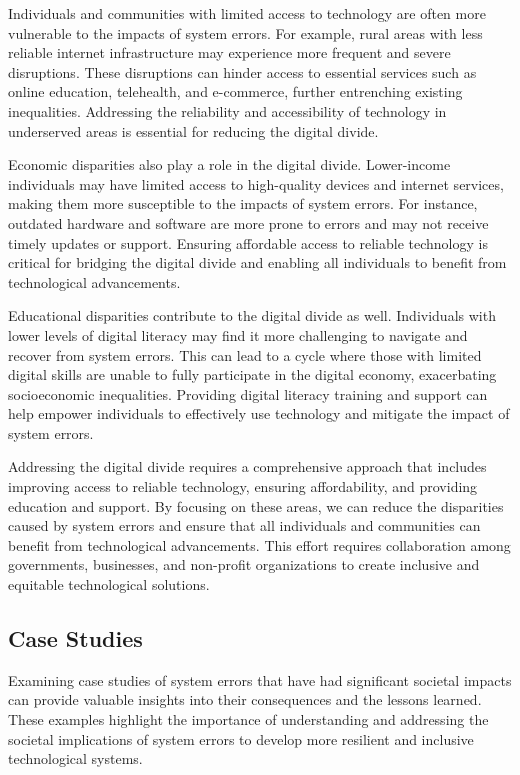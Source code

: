 \documentclass[10pt, conference, letterpaper]{IEEEtran}
\begin{document}
Individuals and communities with limited access to technology are often more vulnerable to the impacts of system errors. For example, rural areas with less reliable internet infrastructure may experience more frequent and severe disruptions. These disruptions can hinder access to essential services such as online education, telehealth, and e-commerce, further entrenching existing inequalities. Addressing the reliability and accessibility of technology in underserved areas is essential for reducing the digital divide.

Economic disparities also play a role in the digital divide. Lower-income individuals may have limited access to high-quality devices and internet services, making them more susceptible to the impacts of system errors. For instance, outdated hardware and software are more prone to errors and may not receive timely updates or support. Ensuring affordable access to reliable technology is critical for bridging the digital divide and enabling all individuals to benefit from technological advancements.

Educational disparities contribute to the digital divide as well. Individuals with lower levels of digital literacy may find it more challenging to navigate and recover from system errors. This can lead to a cycle where those with limited digital skills are unable to fully participate in the digital economy, exacerbating socioeconomic inequalities. Providing digital literacy training and support can help empower individuals to effectively use technology and mitigate the impact of system errors.

Addressing the digital divide requires a comprehensive approach that includes improving access to reliable technology, ensuring affordability, and providing education and support. By focusing on these areas, we can reduce the disparities caused by system errors and ensure that all individuals and communities can benefit from technological advancements. This effort requires collaboration among governments, businesses, and non-profit organizations to create inclusive and equitable technological solutions.

\subsection{Case Studies}
Examining case studies of system errors that have had significant societal impacts can provide valuable insights into their consequences and the lessons learned. These examples highlight the importance of understanding and addressing the societal implications of system errors to develop more resilient and inclusive technological systems.
\end{document}
